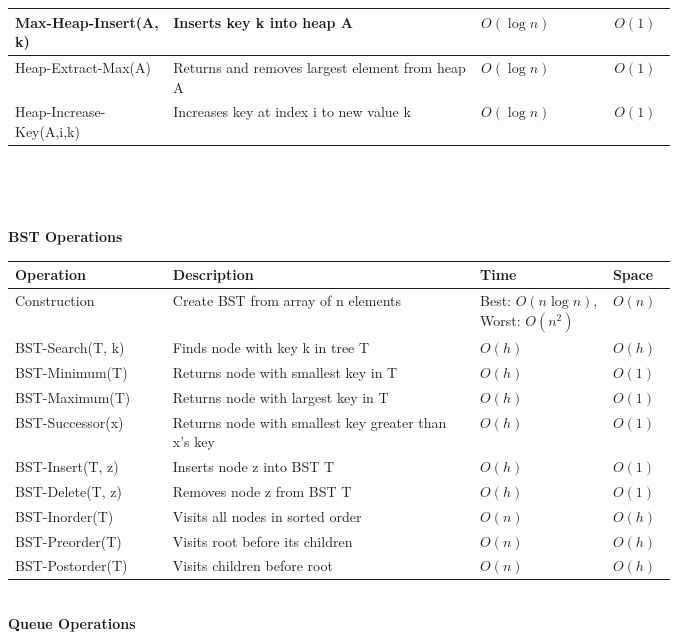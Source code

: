 \documentclass[a4paper]{extarticle}
\begin{document}
\begin{paracol}{3}
{\begin{minipage}[t]{1\linewidth}
\begin{minipage}[t]{1\linewidth}
\begin{tabular}{|p{0.19\linewidth}|p{0.37\linewidth}|p{0.168\linewidth}|p{0.04\linewidth}|}
    \hline
    Max-Heap-Insert(A, k) & Inserts key k into heap A & $O(\log n)$ & $O(1)$ \\
    \hline
    Heap-Extract-Max(A) & Returns and removes largest element from heap A & $O(\log n)$ & $O(1)$ \\
    \hline
    Heap-Increase-Key(A,i,k) & Increases key at index i to new value k & $O(\log n)$ & $O(1)$ \\
    \hline
    \end{tabular}\\
    \end{minipage}\\
    \begin{minipage}[t]{1\linewidth}
    \textbf{BST Operations}\\
    \begin{tabular}{|p{0.19\linewidth}|p{0.37\linewidth}|p{0.168\linewidth}|p{0.04\linewidth}|}
    \hline
    \textbf{Operation} & \textbf{Description} & \textbf{Time} & \textbf{Space} \\
    \hline
    Construction & Create BST from array of n elements & Best: $O(n\log n)$, Worst: $O(n^2)$ & $O(n)$ \\
    \hline
    BST-Search(T, k) & Finds node with key k in tree T & $O(h)$ & $O(h)$ \\
    \hline
    BST-Minimum(T) & Returns node with smallest key in T & $O(h)$ & $O(1)$ \\
    \hline
    BST-Maximum(T) & Returns node with largest key in T & $O(h)$ & $O(1)$ \\
    \hline
    BST-Successor(x) & Returns node with smallest key greater than x's key & $O(h)$ & $O(1)$ \\
    \hline
    BST-Insert(T, z) & Inserts node z into BST T & $O(h)$ & $O(1)$ \\
    \hline
    BST-Delete(T, z) & Removes node z from BST T & $O(h)$ & $O(1)$ \\
    \hline
    BST-Inorder(T) & Visits all nodes in sorted order & $O(n)$ & $O(h)$ \\
    \hline
    BST-Preorder(T) & Visits root before its children & $O(n)$ & $O(h)$ \\
    \hline
    BST-Postorder(T) & Visits children before root & $O(n)$ & $O(h)$ \\
    \hline
    \end{tabular}\\
    \textbf{ Queue Operations}\\
    \begin{tabular}{|p{0.19\linewidth}|p{0.37\linewidth}|p{0.168\linewidth}|p{0.04\linewidth}|}

\end{tabular}
\end{minipage}
\end{minipage}}
\end{paracol}
\end{document}
